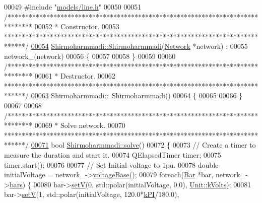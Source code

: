 \begin{DoxyCode}
00049 \textcolor{preprocessor}{#include "\hyperlink{line_8h}{models/line.h}"}
00050 
00051 \textcolor{comment}{/*******************************************************************************}
00052 \textcolor{comment}{ * Constructor.}
00053 \textcolor{comment}{ ******************************************************************************/}
\hypertarget{shirmoharmmadi_8cpp_source_l00054}{}\hyperlink{group___algorithms_gaa5833386f9b43019a318c81a3006e2b1}{00054} \hyperlink{group___algorithms_gaa5833386f9b43019a318c81a3006e2b1}{Shirmoharmmadi::Shirmoharmmadi}(\hyperlink{class_network}{Network} *network) :
00055   network\_(network)
00056 \{
00057 
00058 \}
00059 
00060 \textcolor{comment}{/*******************************************************************************}
00061 \textcolor{comment}{ * Destructor.}
00062 \textcolor{comment}{ ******************************************************************************/}
\hypertarget{shirmoharmmadi_8cpp_source_l00063}{}\hyperlink{group___algorithms_gac89016d70d3c99339af11f3b6f1f23b2}{00063} \hyperlink{group___algorithms_gac89016d70d3c99339af11f3b6f1f23b2}{Shirmoharmmadi::~Shirmoharmmadi}()
00064 \{
00065 
00066 \}
00067 
00068 \textcolor{comment}{/*******************************************************************************}
00069 \textcolor{comment}{ * Solve network.}
00070 \textcolor{comment}{ ******************************************************************************/}
\hypertarget{shirmoharmmadi_8cpp_source_l00071}{}\hyperlink{group___algorithms_gacb4a06c62b5d97c25bea70acd477e715}{00071} \textcolor{keywordtype}{bool} \hyperlink{group___algorithms_gacb4a06c62b5d97c25bea70acd477e715}{Shirmoharmmadi::solve}()
00072 \{
00073   \textcolor{comment}{// Create a timer to measure the duration and start it.}
00074   QElapsedTimer timer;
00075   timer.start();
00076 
00077   \textcolor{comment}{// Set Initial voltage to 1pu.}
00078   \textcolor{keywordtype}{double} initialVoltage = network\_->\hyperlink{group___models_ga88cd2506aaf0b19513e41f00608093e0}{voltageBase}();
00079   \textcolor{keywordflow}{foreach}(\hyperlink{class_bar}{Bar} *bar, network\_->\hyperlink{class_network_ae37a8418e42adf765b143cdc9d992b6c}{bars}) \{
00080     bar->\hyperlink{group___models_ga8d1e70b2d11ed4245e81b8b20858079d}{setV}(0, std::polar(initialVoltage, 0.0), \hyperlink{class_unit_a55b07dfa9457e1eca2c7194fe0cfc3c1aa54b2473993a702a3923525765bd6e4c}{Unit::kVolts});
00081     bar->\hyperlink{group___models_ga8d1e70b2d11ed4245e81b8b20858079d}{setV}(1, std::polar(initialVoltage, 120.0*\hyperlink{math__constants_8h_a368d99984512d9a6c6f18b37b4446431}{kPI}/180.0), 

\end{DoxyCode}
